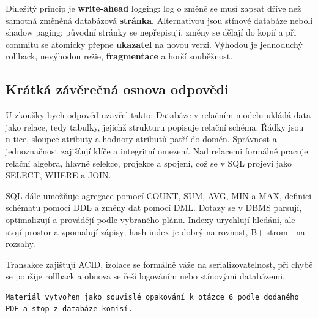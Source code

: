 Důležitý princip je \textbf{write-ahead} logging: log o změně se musí zapsat dříve než samotná změněná databázová \textbf{stránka}. Alternativou jsou stínové databáze neboli shadow paging: původní stránky se nepřepisují, změny se dělají do kopií a při commitu se atomicky přepne \textbf{ukazatel} na novou verzi. Výhodou je jednoduchý rollback, nevýhodou režie, \textbf{fragmentace} a horší souběžnost.

\subsection*{Krátká závěrečná osnova odpovědi}

U zkoušky bych odpověď uzavřel takto: Databáze v relačním modelu ukládá data jako relace, tedy tabulky, jejichž strukturu popisuje relační schéma. Řádky jsou n-tice, sloupce atributy a hodnoty atributů patří do domén. Správnost a jednoznačnost zajišťují klíče a integritní omezení. Nad relacemi formálně pracuje relační algebra, hlavně selekce, projekce a spojení, což se v SQL projeví jako SELECT, WHERE a JOIN.

SQL dále umožňuje agregace pomocí COUNT, SUM, AVG, MIN a MAX, definici schématu pomocí DDL a změny dat pomocí DML. Dotazy se v DBMS parsují, optimalizují a provádějí podle vybraného plánu. Indexy urychlují hledání, ale stojí prostor a zpomalují zápisy; hash index je dobrý na rovnost, B+ strom i na rozsahy.

Transakce zajišťují ACID, izolace se formálně váže na serializovatelnost, při chybě se použije rollback a obnova se řeší logováním nebo stínovými databázemi.

\begin{codebox}
\small
\begin{verbatim}
Materiál vytvořen jako souvislé opakování k otázce 6 podle dodaného PDF a stop z databáze komisí.
\end{verbatim}
\end{codebox}

\newpage

